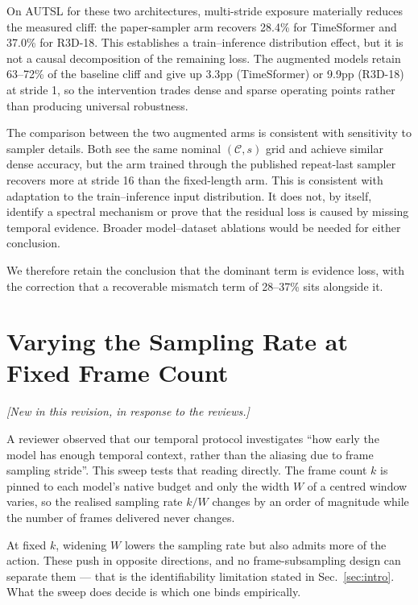 \documentclass[runningheads]{llncs}
\newcommand{\rev}[1]{\textcolor{revblue}{#1}}
\newcommand{\revnote}{\noindent\textcolor{revblue}{\small\itshape
  [New in this revision, in response to the reviews.]}\par\vspace{2pt}}
\begin{document}
\rev{On AUTSL for these two architectures, multi-stride exposure materially reduces the measured cliff: the paper-sampler arm recovers 28.4\% for TimeSformer and 37.0\% for R3D-18. This establishes a train--inference distribution effect, but it is not a causal decomposition of the remaining loss. The augmented models retain 63--72\% of the baseline cliff and give up 3.3pp (TimeSformer) or 9.9pp (R3D-18) at stride 1, so the intervention trades dense and sparse operating points rather than producing universal robustness.}

\rev{The comparison between the two augmented arms is consistent with sensitivity to sampler details. Both see the same nominal $(\mathcal{C},s)$ grid and achieve similar dense accuracy, but the arm trained through the published repeat-last sampler recovers more at stride 16 than the fixed-length arm. This is consistent with adaptation to the train--inference input distribution. It does not, by itself, identify a spectral mechanism or prove that the residual loss is caused by missing temporal evidence. Broader model--dataset ablations would be needed for either conclusion.}

We therefore retain the conclusion that the dominant term is evidence loss, with
the correction that a recoverable mismatch term of 28--37\% sits alongside it.

\section{\rev{Varying the Sampling Rate at Fixed Frame Count}}
\revnote
\label{sec:sup_span}

A reviewer observed that our temporal protocol investigates ``how early the
model has enough temporal context, rather than the aliasing due to frame
sampling stride''. This sweep tests that reading directly. The frame count $k$ is
pinned to each model's native budget and only the width $W$ of a centred window
varies, so the realised sampling rate $k/W$ changes by an order of magnitude
while the number of frames delivered never changes.

At fixed $k$, widening $W$ lowers the sampling rate but also admits more of the
action. These push in opposite directions, and no frame-subsampling design can
separate them --- that is the identifiability limitation stated in
Sec.~\ref{sec:intro}. What the sweep does decide is which one binds empirically.
\end{document}
